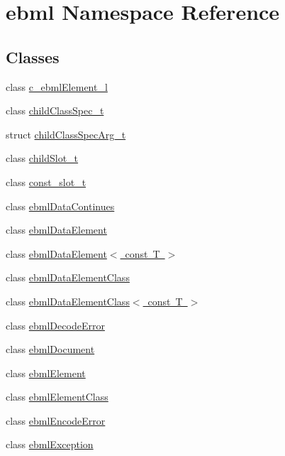 \hypertarget{namespaceebml}{}\section{ebml Namespace Reference}
\label{namespaceebml}
\subsection*{Classes}
\begin{DoxyCompactItemize}
\item 
class \mbox{\hyperlink{classebml_1_1c__ebmlElement__l}{c\+\_\+ebml\+Element\+\_\+l}}
\item 
class \mbox{\hyperlink{classebml_1_1childClassSpec__t}{child\+Class\+Spec\+\_\+t}}
\item 
struct \mbox{\hyperlink{structebml_1_1childClassSpecArg__t}{child\+Class\+Spec\+Arg\+\_\+t}}
\item 
class \mbox{\hyperlink{classebml_1_1childSlot__t}{child\+Slot\+\_\+t}}
\item 
class \mbox{\hyperlink{classebml_1_1const__slot__t}{const\+\_\+slot\+\_\+t}}
\item 
class \mbox{\hyperlink{classebml_1_1ebmlDataContinues}{ebml\+Data\+Continues}}
\item 
class \mbox{\hyperlink{classebml_1_1ebmlDataElement}{ebml\+Data\+Element}}
\item 
class \mbox{\hyperlink{classebml_1_1ebmlDataElement_3_01const_01T_01_4}{ebml\+Data\+Element$<$ const T $>$}}
\item 
class \mbox{\hyperlink{classebml_1_1ebmlDataElementClass}{ebml\+Data\+Element\+Class}}
\item 
class \mbox{\hyperlink{classebml_1_1ebmlDataElementClass_3_01const_01T_01_4}{ebml\+Data\+Element\+Class$<$ const T $>$}}
\item 
class \mbox{\hyperlink{classebml_1_1ebmlDecodeError}{ebml\+Decode\+Error}}
\item 
class \mbox{\hyperlink{classebml_1_1ebmlDocument}{ebml\+Document}}
\item 
class \mbox{\hyperlink{classebml_1_1ebmlElement}{ebml\+Element}}
\item 
class \mbox{\hyperlink{classebml_1_1ebmlElementClass}{ebml\+Element\+Class}}
\item 
class \mbox{\hyperlink{classebml_1_1ebmlEncodeError}{ebml\+Encode\+Error}}
\item 
class \mbox{\hyperlink{classebml_1_1ebmlException}{ebml\+Exception}}
\item 

\end{DoxyCompactItemize}
